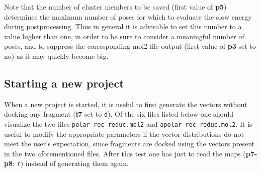 \documentclass[a4paper,12pt,titlepage]{article}
\begin{document}
\noindent
Note that the number of cluster members to be saved (first value of \textbf{p5}) determines 
the maximum number of poses for which to evaluate the slow energy during postprocessing. Thus 
in general it is advisable to set this number to a value higher than one, in order to be sure to consider a meaningful number of poses, and to suppress the corresponding mol2 file output (first value of \textbf{p3} set to no) as it may quickly become big.

\subsection{Starting a new project}

When a new project is started, it is useful to first generate the vectors 
without docking any fragment ({\bf i7} set to {\tt d}). 
Of the six files listed below one should visualize the two files 
{\tt polar\_rec\_reduc.mol2} and {\tt apolar\_rec\_reduc.mol2}. It is 
useful to modify the appropriate parameters 
if the vector distributions do not meet the user's expectation, since 
fragments are docked using the vectors present in the two aforementioned 
files. After this test one has just to read the maps ({\bf p7-p8}: {\tt r}) 
instead of generating them again.
\end{document}
